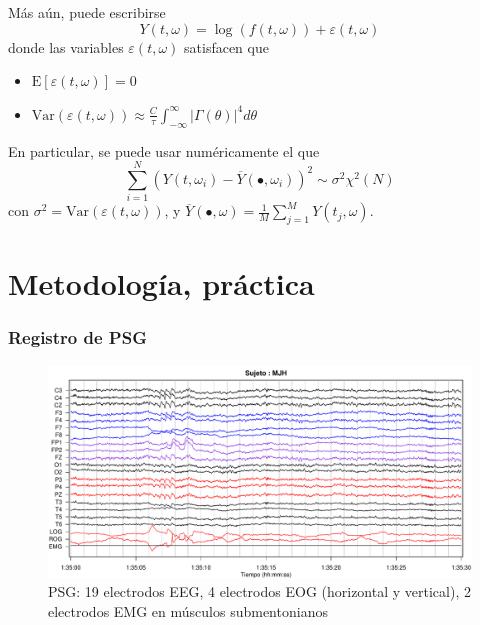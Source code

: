 \documentclass[11pt]{beamer}
\newcommand{\intR}{\int_{-\infty}^{\infty}}
\newcommand{\E}[1]{\mathrm{E}\left[ #1 \right]}
\newcommand{\Var}[1]{\mathrm{Var}\left( #1 \right)}
\newcommand{\abso}[1]{\left| #1 \right|}
\begin{document}

\begin{frame}%
M\'as a\'un, puede escribirse
\begin{equation*}
Y(t,\omega) = \log \left( f(t,\omega) \right) + \varepsilon(t,\omega)
\end{equation*}
donde las variables $\varepsilon(t,\omega)$ satisfacen que
\begin{itemize}
\item $\displaystyle \E{\varepsilon(t,\omega)} = 0$
\item $\displaystyle \Var{\varepsilon(t,\omega)}
\approx \frac{C}{\tau} \intR \abso{\Gamma (\theta)}^{4} d\theta$
\end{itemize}

En particular, se puede usar num\'ericamente el que
\begin{equation*}
\sum_{i = 1 }^{N} \left( Y(t,\omega_i) - \overline{Y}(\bullet,\omega_i) \right)^{2} 
\sim \sigma^{2} \chi^{2}(N)
\end{equation*}
con $\sigma^{2} = \Var{\varepsilon(t,\omega)}$, y
$\overline{Y}(\bullet,\omega) = \frac{1}{M} \sum_{j=1}^{M} Y(t_j,\omega)$.
\end{frame}


\section{Metodolog\'ia, pr\'actica}

\begin{frame}\frametitle{Registro de PSG}
\begin{figure}
\centering
\includegraphics[width=0.9\linewidth]{./img_ejemplos/MJH_190_PDG_lucirse_PSG.pdf}
\caption{PSG: 19 electrodos EEG, 4 electrodos EOG (horizontal y vertical), 2 electrodos EMG en 
m\'usculos submentonianos}
\end{figure}
\end{frame}
\end{document}
